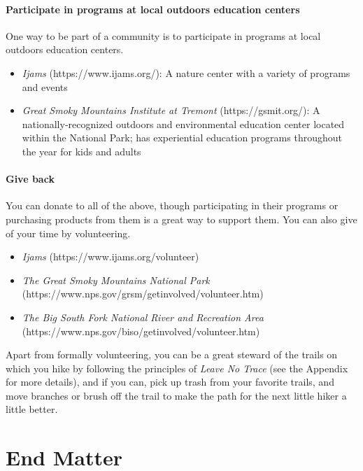 \documentclass[
  letterpaper,
  DIV=11,
  numbers=noendperiod]{scrreprt}
\providecommand{\tightlist}{%
  \setlength{\itemsep}{0pt}\setlength{\parskip}{0pt}}\usepackage{longtable,booktabs,array}
\begin{document}
\subsection{Participate in programs at local outdoors education
centers}\label{participate-in-programs-at-local-outdoors-education-centers}

One way to be part of a community is to participate in programs at local
outdoors education centers.

\begin{itemize}
\tightlist
\item
  \emph{Ijams} (https://www.ijams.org/): A nature center with a variety
  of programs and events
\item
  \emph{Great Smoky Mountains Institute at Tremont}
  (https://gsmit.org/): A nationally-recognized outdoors and
  environmental education center located within the National Park; has
  experiential education programs throughout the year for kids and
  adults
\end{itemize}

\subsection{Give back}\label{give-back}

You can donate to all of the above, though participating in their
programs or purchasing products from them is a great way to support
them. You can also give of your time by volunteering.

\begin{itemize}
\tightlist
\item
  \emph{Ijams} (https://www.ijams.org/volunteer)
\item
  \emph{The Great Smoky Mountains National Park}
  (https://www.nps.gov/grsm/getinvolved/volunteer.htm)
\item
  \emph{The Big South Fork National River and Recreation Area}
  (https://www.nps.gov/biso/getinvolved/volunteer.htm)
\end{itemize}

Apart from formally volunteering, you can be a great steward of the
trails on which you hike by following the principles of \emph{Leave No
Trace} (see the Appendix for more details), and if you can, pick up
trash from your favorite trails, and move branches or brush off the
trail to make the path for the next little hiker a little better.

\part{End Matter}
\end{document}
